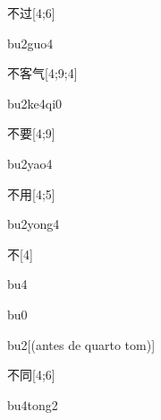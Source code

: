 \begin{verbete}[bu2guo4]{不过}[4;6]
\begin{pronuncia}{bu2guo4}
\end{pronuncia}
\end{verbete}

\begin{verbete}[bu2ke4qi0]{不客气}[4;9;4]
\begin{pronuncia}{bu2ke4qi0}
\end{pronuncia}
\end{verbete}

\begin{verbete}[bu2yao4]{不要}[4;9]
\begin{pronuncia}{bu2yao4}
\end{pronuncia}
\end{verbete}

\begin{verbete}[bu2yong4]{不用}[4;5]
\begin{pronuncia}{bu2yong4}
\end{pronuncia}
\end{verbete}

\begin{verbete}[bu4]{不}[4]
\begin{pronuncia}{bu4}
\end{pronuncia}
\begin{pronuncia}{bu0}
\end{pronuncia}
\begin{pronuncia}{bu2}[(antes de quarto tom)]
\end{pronuncia}
\end{verbete}

\begin{verbete}[bu4tong2]{不同}[4;6]
\begin{pronuncia}{bu4tong2}
\end{pronuncia}
\end{verbete}

